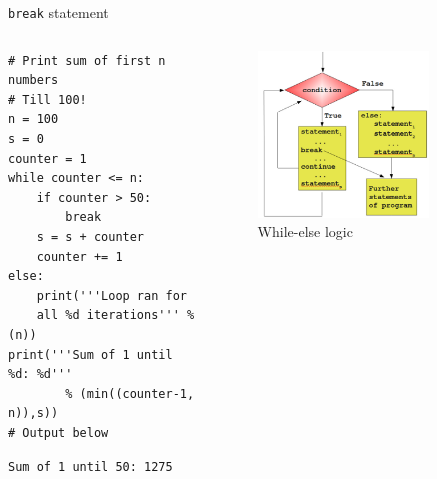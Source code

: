 \documentclass[presentation]{beamer}
\begin{document}
\begin{frame}[label={sec:org9e00a44},fragile]{\texttt{break} statement}
 \begin{columns}
\begin{column}{0.48\columnwidth}
\scriptsize
\begin{verbatim}
# Print sum of first n numbers
# Till 100!
n = 100
s = 0
counter = 1
while counter <= n:
    if counter > 50:
        break
    s = s + counter
    counter += 1
else:
    print('''Loop ran for
    all %d iterations''' % (n))
print('''Sum of 1 until %d: %d'''
        % (min((counter-1, n)),s))
# Output below
\end{verbatim}

\begin{verbatim}
Sum of 1 until 50: 1275
\end{verbatim}
\end{column}


\begin{column}{0.45\columnwidth}
\footnotesize
\begin{figure}[htbp]
\centering
\includegraphics[width=0.8\textwidth]{images/while_loop_with_else_break.png}
\caption{While-else logic}
\end{figure}
\end{column}
\end{columns}
\end{frame}
\end{document}
